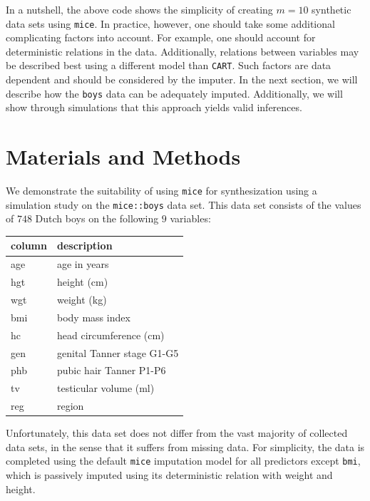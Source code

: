\documentclass[psych,article,submit,moreauthors,pdftex]{mdpi}
\begin{document}
In a nutshell, the above code shows the simplicity of creating
\(m = 10\) synthetic data sets using \texttt{mice}. In practice,
however, one should take some additional complicating factors into
account. For example, one should account for deterministic relations in
the data. Additionally, relations between variables may be described
best using a different model than \texttt{CART}. Such factors are data
dependent and should be considered by the imputer. In the next section,
we will describe how the \texttt{boys} data can be adequately imputed.
Additionally, we will show through simulations that this approach yields
valid inferences.

\hypertarget{materials-and-methods}{%
\section{Materials and Methods}\label{materials-and-methods}}

We demonstrate the suitability of using \texttt{mice} for synthesization
using a simulation study on the \texttt{mice::boys} data set. This data
set consists of the values of \(748\) Dutch boys on the following \(9\)
variables:

\begin{longtable}[]{@{}ll@{}}
\toprule
column & description \\
\midrule
\endhead
age & age in years \\
hgt & height (cm) \\
wgt & weight (kg) \\
bmi & body mass index \\
hc & head circumference (cm) \\
gen & genital Tanner stage G1-G5 \\
phb & pubic hair Tanner P1-P6 \\
tv & testicular volume (ml) \\
reg & region \\
\bottomrule
\end{longtable}

Unfortunately, this data set does not differ from the vast majority of
collected data sets, in the sense that it suffers from missing data. For
simplicity, the data is completed using the default \texttt{mice}
imputation model for all predictors except \texttt{bmi}, which is
passively imputed using its deterministic relation with weight and
height.
\end{document}
